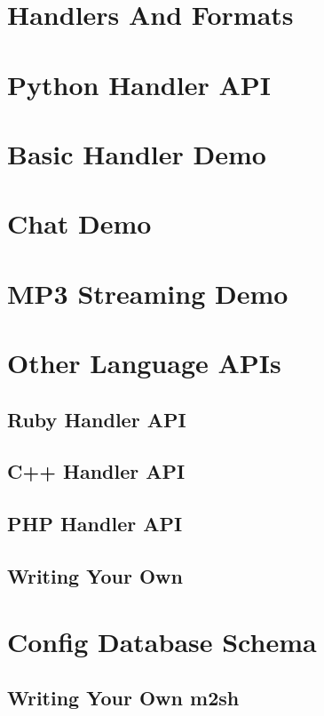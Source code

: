 \section{Handlers And Formats}


\section{Python Handler API}


\section{Basic Handler Demo}


\section{Chat Demo}


\section{MP3 Streaming Demo}


\section{Other Language APIs}


\subsection{Ruby Handler API}


\subsection{C++ Handler API}


\subsection{PHP Handler API}


\subsection{Writing Your Own}


\section{Config Database Schema}


\subsection{Writing Your Own m2sh}



